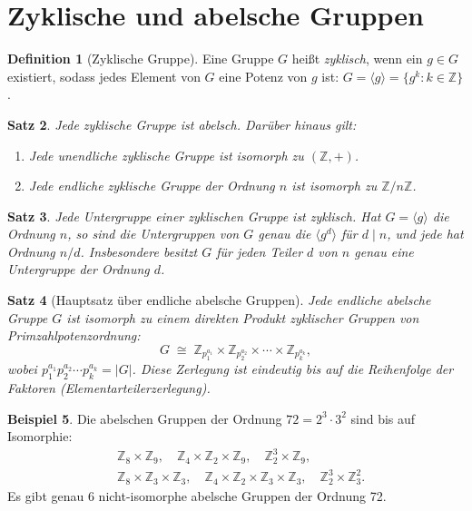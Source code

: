 \documentclass[12pt,a4paper]{amsart}
\newtheorem{theorem}{Satz}[section]
\theoremstyle{definition}
\newtheorem{definition}[theorem]{Definition}
\newtheorem{example}[theorem]{Beispiel}
\begin{document}
\section{Zyklische und abelsche Gruppen}
\label{sec:zyklisch}

\begin{definition}[Zyklische Gruppe]
Eine Gruppe $G$ heißt \emph{zyklisch}, wenn ein $g \in G$ existiert, sodass jedes Element
von $G$ eine Potenz von $g$ ist: $G = \langle g \rangle = \{g^k : k \in \mathbb{Z}\}$.
\end{definition}

\begin{theorem}
Jede zyklische Gruppe ist abelsch. Darüber hinaus gilt:
\begin{enumerate}[label=(\roman*)]
  \item Jede unendliche zyklische Gruppe ist isomorph zu $(\mathbb{Z}, +)$.
  \item Jede endliche zyklische Gruppe der Ordnung $n$ ist isomorph zu
        $\mathbb{Z}/n\mathbb{Z}$.
\end{enumerate}
\end{theorem}

\begin{theorem}
Jede Untergruppe einer zyklischen Gruppe ist zyklisch. Hat $G = \langle g \rangle$ die
Ordnung $n$, so sind die Untergruppen von $G$ genau die $\langle g^d \rangle$ für $d \mid n$,
und jede hat Ordnung $n/d$. Insbesondere besitzt $G$ für jeden Teiler $d$ von $n$ genau eine
Untergruppe der Ordnung $d$.
\end{theorem}

\begin{theorem}[Hauptsatz über endliche abelsche Gruppen]
\label{thm:hsuag}
Jede endliche abelsche Gruppe $G$ ist isomorph zu einem direkten Produkt zyklischer Gruppen
von Primzahlpotenzordnung:
\[
  G \;\cong\; \mathbb{Z}_{p_1^{a_1}} \times \mathbb{Z}_{p_2^{a_2}} \times \cdots
              \times \mathbb{Z}_{p_k^{a_k}},
\]
wobei $p_1^{a_1} p_2^{a_2} \cdots p_k^{a_k} = |G|$. Diese Zerlegung ist eindeutig bis auf
die Reihenfolge der Faktoren (Elementarteilerzerlegung).
\end{theorem}

\begin{example}
Die abelschen Gruppen der Ordnung $72 = 2^3 \cdot 3^2$ sind bis auf Isomorphie:
\begin{align*}
  &\mathbb{Z}_8 \times \mathbb{Z}_9,\quad
   \mathbb{Z}_4 \times \mathbb{Z}_2 \times \mathbb{Z}_9,\quad
   \mathbb{Z}_2^3 \times \mathbb{Z}_9,\\
  &\mathbb{Z}_8 \times \mathbb{Z}_3 \times \mathbb{Z}_3,\quad
   \mathbb{Z}_4 \times \mathbb{Z}_2 \times \mathbb{Z}_3 \times \mathbb{Z}_3,\quad
   \mathbb{Z}_2^3 \times \mathbb{Z}_3^2.
\end{align*}
Es gibt genau 6 nicht-isomorphe abelsche Gruppen der Ordnung 72.
\end{example}
\end{document}
